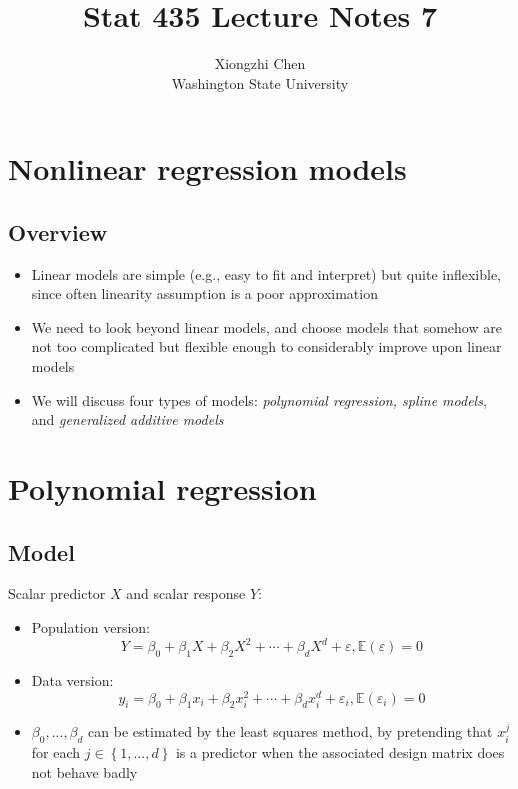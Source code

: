 \documentclass[]{article}
\title{Stat 435 Lecture Notes 7}
\author{Xiongzhi Chen \\ Washington State University}
\date{}
\providecommand{\tightlist}{%
  \setlength{\itemsep}{0pt}\setlength{\parskip}{0pt}}
\begin{document}
\maketitle

{
\setcounter{tocdepth}{2}
\tableofcontents
}
\section{}\label{section}

\section{Nonlinear regression models}\label{nonlinear-regression-models}

\subsection{Overview}\label{overview}

\begin{itemize}
\item
  Linear models are simple (e.g., easy to fit and interpret) but quite
  inflexible, since often linearity assumption is a poor approximation
\item
  We need to look beyond linear models, and choose models that somehow
  are not too complicated but flexible enough to considerably improve
  upon linear models
\item
  We will discuss four types of models: \emph{polynomial regression,
  spline models}, and \emph{generalized additive models}
\end{itemize}

\section{Polynomial regression}\label{polynomial-regression}

\subsection{Model}\label{model}

Scalar predictor \(X\) and scalar response \(Y\):

\begin{itemize}
\tightlist
\item
  Population version:
  \[Y=\beta_{0}+\beta_{1}X+\beta_{2}X^{2}+\cdots+\beta_{d}X^{d}+\varepsilon, \mathbb{E}(\varepsilon)=0\]
\item
  Data version:
  \[y_{i}=\beta_{0}+\beta_{1}x_{i}+\beta_{2}x_{i}^{2}+\cdots+\beta_{d}x_{i}%
  ^{d}+\varepsilon_{i}, \mathbb{E}(\varepsilon_i)=0\]
\item
  \(\beta_{0},...,\beta_{d}\) can be estimated by the least squares
  method, by pretending that \(x_{i}^{j}\) for each
  \(j\in\left\{ 1,...,d\right\}\) is a predictor when the associated
  design matrix does not behave badly
\end{itemize}
\end{document}
